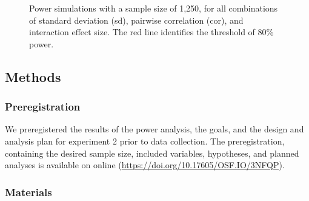 \documentclass[
]{interact}
\begin{document}
\label{cell-fig-power-1250}
\begin{figure}[H]


\caption{\label{fig-power-1250}Power simulations with a sample size of
1,250, for all combinations of standard deviation (sd), pairwise
correlation (cor), and interaction effect size. The red line identifies
the threshold of 80\% power.}

\end{figure}%

\subsection{Methods}\label{sec-exp2-methods}

\subsubsection{Preregistration}\label{sec-exp2-prereg}

We preregistered the results of the power analysis, the goals, and the
design and analysis plan for experiment 2 prior to data collection. The
preregistration, containing the desired sample size, included variables,
hypotheses, and planned analyses is available on online
(\url{https://doi.org/10.17605/OSF.IO/3NFQP}).

\subsubsection{Materials}\label{sec-exp2-methods-materials}
\end{document}
